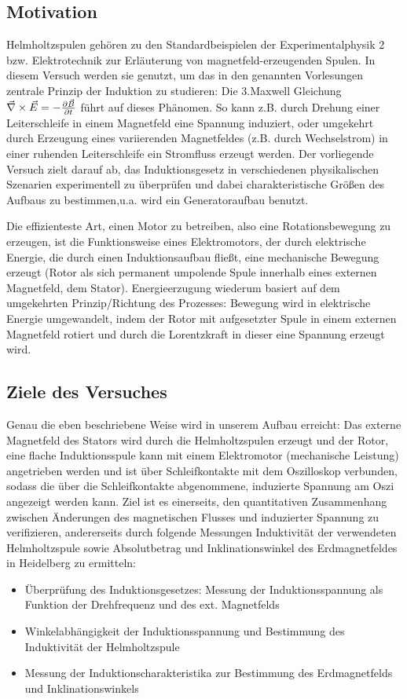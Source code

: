 \subsection{Motivation}
Helmholtzspulen gehören zu den Standardbeispielen der Experimentalphysik 2 bzw. Elektrotechnik zur Erläuterung von magnetfeld-erzeugenden Spulen. In diesem Versuch werden sie genutzt, um das in den genannten Vorlesungen zentrale Prinzip der Induktion zu studieren: Die 3.Maxwell Gleichung \(\vec{\nabla}\times \vec{E}=-\frac{\partial \vec{B}}{\partial t}\) führt auf dieses Phänomen. So kann z.B. durch Drehung einer Leiterschleife in einem Magnetfeld eine Spannung induziert, oder umgekehrt durch Erzeugung eines variierenden Magnetfeldes (z.B. durch Wechselstrom) in einer ruhenden Leiterschleife ein Stromfluss erzeugt werden. Der vorliegende Versuch zielt darauf ab, das Induktionsgesetz in verschiedenen physikalischen Szenarien experimentell zu überprüfen und dabei charakteristische Größen des Aufbaus zu bestimmen,u.a. wird ein Generatoraufbau benutzt. 

Die effizienteste Art, einen Motor zu betreiben, also eine Rotationsbewegung zu erzeugen, ist die Funktionsweise eines Elektromotors, der durch elektrische Energie, die durch einen Induktionsaufbau fließt, eine mechanische Bewegung erzeugt (Rotor als sich permanent umpolende Spule innerhalb eines externen Magnetfeld, dem Stator). Energieerzugung wiederum basiert auf dem umgekehrten Prinzip/Richtung des Prozesses: Bewegung wird in elektrische Energie umgewandelt, indem der Rotor mit aufgesetzter Spule in einem externen Magnetfeld rotiert und durch die Lorentzkraft in dieser eine Spannung erzeugt wird. 

\subsection{Ziele des Versuches}
Genau die eben beschriebene Weise wird in unserem Aufbau erreicht: Das externe Magnetfeld des Stators wird durch die Helmholtzspulen erzeugt und der Rotor, eine flache Induktionsspule kann mit einem Elektromotor (mechanische Leistung) angetrieben werden und ist über Schleifkontakte mit dem Oszilloskop verbunden, sodass die über die Schleifkontakte abgenommene, induzierte Spannung am Oszi angezeigt werden kann. Ziel ist es einerseits, den quantitativen Zusammenhang zwischen Änderungen des magnetischen Flusses und induzierter Spannung zu verifizieren, andererseits durch folgende Messungen Induktivität der verwendeten Helmholtzspule sowie Absolutbetrag und Inklinationswinkel des Erdmagnetfeldes in Heidelberg zu ermitteln:
\begin{itemize}
    \item Überprüfung des Induktionsgesetzes: Messung der Induktionsspannung als Funktion der Drehfrequenz und des ext. Magnetfelds
    \item Winkelabhängigkeit der Induktionsspannung und Bestimmung des Induktivität der Helmholtzspule
    \item Messung der Induktionscharakteristika zur Bestimmung des Erdmagnetfelds und Inklinationswinkels
\end{itemize}

